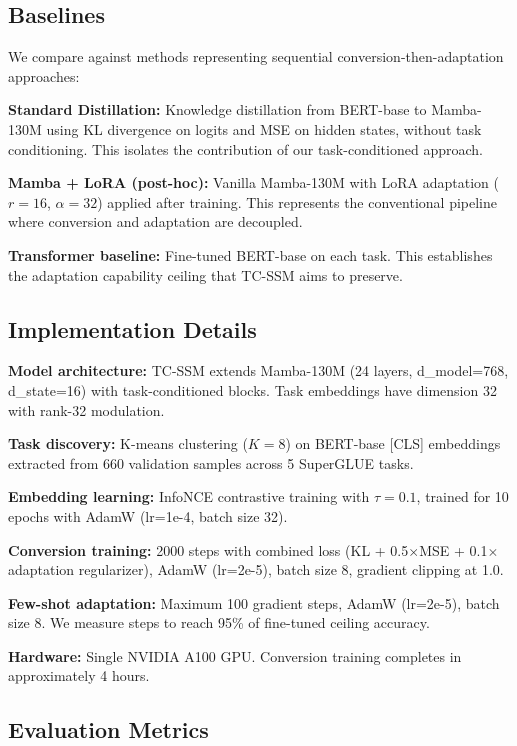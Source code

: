 \subsection{Baselines}

We compare against methods representing sequential conversion-then-adaptation approaches:

\textbf{Standard Distillation:} Knowledge distillation from BERT-base to Mamba-130M using KL divergence on logits and MSE on hidden states, without task conditioning. This isolates the contribution of our task-conditioned approach.

\textbf{Mamba + LoRA (post-hoc):} Vanilla Mamba-130M with LoRA adaptation ($r=16$, $\alpha=32$) applied after training. This represents the conventional pipeline where conversion and adaptation are decoupled.

\textbf{Transformer baseline:} Fine-tuned BERT-base on each task. This establishes the adaptation capability ceiling that TC-SSM aims to preserve.

\subsection{Implementation Details}

\textbf{Model architecture:} TC-SSM extends Mamba-130M (24 layers, d\_model=768, d\_state=16) with task-conditioned blocks. Task embeddings have dimension 32 with rank-32 modulation.

\textbf{Task discovery:} K-means clustering ($K=8$) on BERT-base [CLS] embeddings extracted from 660 validation samples across 5 SuperGLUE tasks.

\textbf{Embedding learning:} InfoNCE contrastive training with $\tau=0.1$, trained for 10 epochs with AdamW (lr=1e-4, batch size 32).

\textbf{Conversion training:} 2000 steps with combined loss (KL + 0.5$\times$MSE + 0.1$\times$adaptation regularizer), AdamW (lr=2e-5), batch size 8, gradient clipping at 1.0.

\textbf{Few-shot adaptation:} Maximum 100 gradient steps, AdamW (lr=2e-5), batch size 8. We measure steps to reach 95\% of fine-tuned ceiling accuracy.

\textbf{Hardware:} Single NVIDIA A100 GPU. Conversion training completes in approximately 4 hours.

\subsection{Evaluation Metrics}

